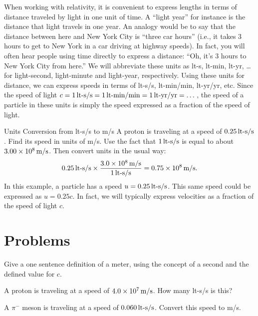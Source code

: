 When working with relativity, it is convenient to express lengths in
terms of distance traveled by light in one unit of time.  A ``light
year'' for instance is the distance that light travels in one year.
An analogy would be to say that the distance between here and New York
City is ``three car hours'' (i.e., it takes 3 hours to get to New York
in a car driving at highway speeds).  In fact, you will often hear
people using time directly to express a distance: ``Oh, it's 3 hours
to New York City from here.''  We will abbreviate these units as lt-s,
lt-min, lt-yr, \dots for light-second, light-minute and light-year,
respectively. Using these units for distance, we can express speeds in
terms of lt-s/s, lt-min/min, lt-yr/yr, etc.  Since the speed of light
$c = 1 \,\mbox{lt-s/s} = 1 \,\mbox{lt-min/min} = 1 \,\mbox{lt-yr/yr} =
\dots$, the speed of a particle in these units is simply the speed
expressed as a fraction of the speed of light.
   
\begin{example}{Units Conversion from lt-s/s to m/s}
  A proton is traveling at a speed of $0.25\,\mbox{lt-s/s}$.  Find its speed in
  units of m/s.  \solution Use the fact that $1\,\mbox{lt-s/s}$ is equal to
  about $3.00\times 10^8\,\mbox{m/s}$.  Then convert units in the
  usual way:
\[ 0.25\,\mbox{lt-s/s} \times 
        \frac{3.0\times 10^8\,\mbox{m/s}}{1\,\mbox{lt-s/s}}
       = 0.75\times 10^8\,\mbox{m/s}.  \]
In this example, a particle has a speed $u = 0.25\,\mbox{lt-s/s}$.  This same
speed could be expressed as $u = 0.25c$.  In fact, we will typically
express velocities as a fraction of the speed of light $c$.
\end{example}

\newpage

\section*{Problems}

\begin{problem}
Give a one sentence definition of a meter, using the concept of
a second and the defined value for $c$.  
\end{problem}

\begin{problem}
A proton is traveling at a speed of $4.0 \times 10^7\,\mbox{m/s}$.  
How many lt-s/s is this?
\label{prob:rel_units}
\end{problem}

\begin{problem}
A $\pi^-$ meson is traveling at a speed of $0.060\,\mbox{lt-s/s}$.  
Convert this speed to m/s. 
\label{prob:rel_units2}
\end{problem}


